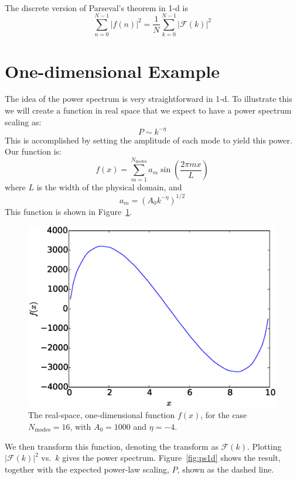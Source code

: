 \documentclass[11pt]{article}
\begin{document}
 \\

The discrete version of Parseval's theorem in 1-d is
\begin{equation}
\sum_{n=0}^{N-1} | f(n) |^2 = \frac{1}{N} \sum_{k=0}^{N-1} | \mathcal{F}(k) |^2
\end{equation}


\section*{One-dimensional Example}

The idea of the power spectrum is very straightforward in 1-d.  To illustrate
this we will create a function in real space that we expect to have a
power spectrum scaling as:
\begin{equation}
P \sim k^{-\eta}
\end{equation}
This is accomplished by setting the amplitude of each mode to yield
this power.  Our function is:
\begin{equation}
f(x) = \sum_{m=1}^{N_\mathrm{modes}} a_m \sin \left ( \frac{2\pi m x}{L}\right )
\end{equation}
where $L$ is the width of the physical domain, and 
\begin{equation}
a_m = \left (A_0 k^{-\eta} \right )^{1/2}
\end{equation}
This function is shown in Figure~\ref{fig:phi1d}.

\begin{figure}[t]
\centering
\includegraphics[width=0.5\linewidth]{phi_1d}
\begin{minipage}[b]{0.45\linewidth}
\caption{\label{fig:phi1d} The real-space, one-dimensional function $f(x)$,
for the case $N_\mathrm{modes} = 16$, with $A_0 = 1000$ and $\eta = -4$.}
\end{minipage}
\end{figure}

We then transform this function, denoting the transform as $\mathcal{F}(k)$.  Plotting
$|\mathcal{F}(k)|^2$ vs.\ $k$ gives the power spectrum.  Figure~\ref{fig:ps1d} shows
the result, together with the expected power-law scaling, $P$, shown as the 
dashed line.
\end{document}
